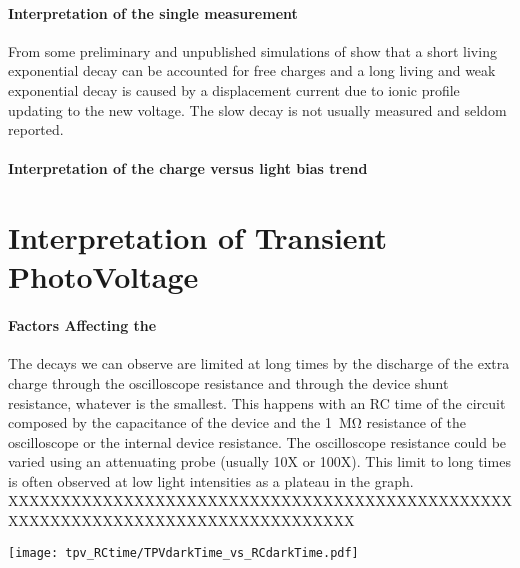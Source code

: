 	\paragraph{Interpretation of the single measurement}
	From some preliminary and unpublished simulations of  show that a short living exponential decay can be accounted for free charges and a long living and weak exponential decay is caused by a displacement current due to ionic profile updating to the new voltage. The slow decay is not usually measured and seldom reported\cite{ORegan2015b}.

	\paragraph{Interpretation of the charge versus light bias trend}


\section{Interpretation of Transient PhotoVoltage}\label{interpretation_tpv}

	\paragraph{Factors Affecting the }
	The decays we can observe are limited at long times by the discharge of the extra charge through the oscilloscope resistance and through the device shunt resistance, whatever is the smallest. This happens with an RC time of the circuit composed by the capacitance of the device and the \SI{1}{\Mohm} resistance of the oscilloscope or the internal device resistance. The oscilloscope resistance could be varied using an attenuating probe (usually 10X or 100X). This limit to long times is often observed at low light intensities as a plateau in the  graph. XXXXXXXXXXXXXXXXXXXXXXXXXXXXXXXXXXXXXXXXXXXXXXXXXXXXXXXXXXXXXXXXXXXXXXXXXXXXXXXXX

	\begin{SCfigure}
		\centering
		\texttt{[image: tpv\_RCtime/TPVdarkTime\_vs\_RCdarkTime.pdf]}
		\label{fig:tpv_RCtime}
	\end{SCfigure}

